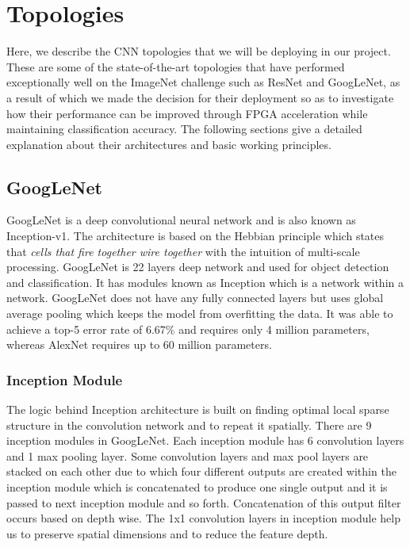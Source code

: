 \documentclass[titlepage]{report}
\begin{document}


\section{Topologies}
Here, we describe the CNN topologies that we will be deploying in our project. These are some of the state-of-the-art topologies that have performed exceptionally well on the ImageNet challenge such as ResNet and GoogLeNet, as a result of which we made the decision for their deployment so as to investigate how their performance can be improved through FPGA acceleration while maintaining classification accuracy. The following sections give a detailed explanation about their architectures and basic working principles.
\subsection{GoogLeNet}
GoogLeNet is a deep convolutional neural network and is also known as Inception-v1. The architecture is based on the Hebbian principle which states that \textit{cells that fire together wire together} with the intuition of multi-scale processing. GoogLeNet is 22 layers deep network and used for object detection and classification. It has modules known as Inception which is a network within a network. GoogLeNet does not have any fully connected layers but uses global average pooling which keeps the model from overfitting the data. It was able to achieve a top-5 error rate of 6.67\% and requires only 4 million parameters, whereas AlexNet requires up to 60 million parameters.

\subsubsection{Inception Module}
The logic behind Inception architecture is built on finding optimal local sparse structure in the convolution network and to repeat it spatially. There are 9 inception modules in GoogLeNet. Each inception module has 6 convolution layers and 1 max pooling layer. Some convolution layers and max pool layers are stacked on each other due to which four different outputs are created within the inception module which is concatenated to produce one single output and it is passed to next inception module and so forth. Concatenation of this output filter occurs based on depth wise. The 1x1 convolution layers in inception module help us to preserve spatial dimensions and to reduce the feature depth.
\end{document}
